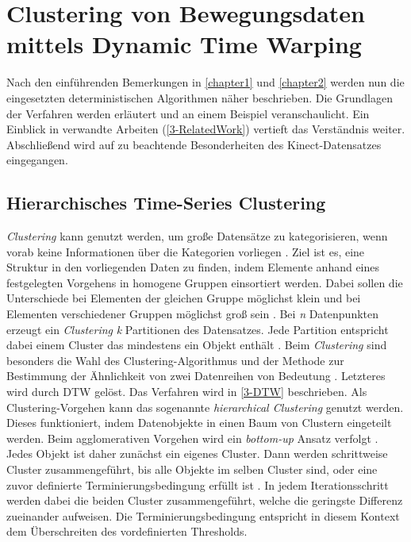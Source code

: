 \chapter{Clustering von Bewegungsdaten mittels Dynamic Time Warping}
\label{chapter3}

Nach den einführenden Bemerkungen in \autoref{chapter1} und \autoref{chapter2} werden nun
die eingesetzten deterministischen Algorithmen näher beschrieben.
Die Grundlagen der Verfahren werden erläutert und an einem Beispiel veranschaulicht.
Ein Einblick in verwandte Arbeiten (\autoref{3-RelatedWork}) vertieft das Verständnis weiter.
Abschließend wird auf zu beachtende Besonderheiten des Kinect-Datensatzes eingegangen.

\section{Hierarchisches Time-Series Clustering}
\label{3-Clustering}
\emph{Clustering} kann genutzt werden, um große Datensätze zu kategorisieren,
wenn vorab keine Informationen über die Kategorien vorliegen \citep{aghabozorgi_time-series_2015}.
Ziel ist es, eine Struktur in den vorliegenden Daten zu finden,
indem Elemente anhand eines festgelegten Vorgehens in homogene Gruppen einsortiert werden.
Dabei sollen die Unterschiede bei Elementen der gleichen Gruppe möglichst klein
und bei Elementen verschiedener Gruppen möglichst groß sein \citep{aghabozorgi_time-series_2015, warren_liao_clustering_2005}.
Bei \emph{n} Datenpunkten erzeugt ein \emph{Clustering} \emph{k} Partitionen des Datensatzes.
Jede Partition entspricht dabei einem Cluster das mindestens ein Objekt enthält \citep{warren_liao_clustering_2005}.
Beim \emph{Clustering} sind besonders die Wahl des Clustering-Algorithmus
und der Methode zur Bestimmung der Ähnlichkeit von zwei Datenreihen von Bedeutung \citep{warren_liao_clustering_2005}.
Letzteres wird durch \ac{DTW} gelöst.
Das Verfahren wird in \autoref{3-DTW} beschrieben.
Als Clustering-Vorgehen kann das sogenannte \emph{hierarchical Clustering} genutzt werden.
Dieses funktioniert, indem Datenobjekte in einen Baum von Clustern eingeteilt werden.
Beim agglomerativen Vorgehen wird ein \emph{bottom-up} Ansatz verfolgt \citep{warren_liao_clustering_2005}.
Jedes Objekt ist daher zunächst ein eigenes Cluster.
Dann werden schrittweise Cluster zusammengeführt,
bis alle Objekte im selben Cluster sind,
oder eine zuvor definierte Terminierungsbedingung erfüllt ist \citep{warren_liao_clustering_2005}.
In jedem Iterationsschritt werden dabei die beiden Cluster zusammengeführt,
welche die geringste Differenz zueinander aufweisen.
Die Terminierungsbedingung entspricht in diesem Kontext dem Überschreiten des vordefinierten Thresholds.

